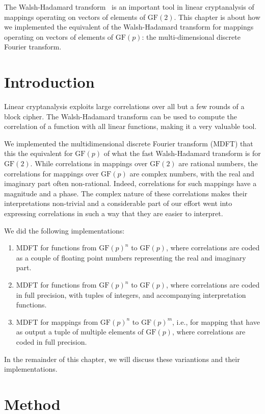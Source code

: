 \documentclass{report}
\newcommand{\GF}{\text{GF}}
\begin{document}
The Walsh-Hadamard transform~\cite{wiki2018transform} is an important tool in linear cryptanalysis of mappings operating on vectors of elements of $\GF(2)$.
This chapter is about how we implemented the equivalent of the Walsh-Hadamard transform for mappings operating on vectors of elements of ${\GF(p)}$: the multi-dimensional discrete Fourier transform.

\section{Introduction}

Linear cryptanalysis exploits large correlations over all but a few rounds of a block cipher. The Walsh-Hadamard transform can be used to compute the correlation of a function with all linear functions, making it a very valuable tool.

We implemented the multidimensional discrete Fourier transform (MDFT) that this the equivalent for $\GF(p)$ of what the fast Walsh-Hadamard transform is for $\GF(2)$. While correlations in mappings over $\GF(2)$ are rational numbers, the correlations for mappings over $\GF(p)$ are complex numbers, with the real and imaginary part often non-rational. Indeed, correlations for such mappings have a magnitude and a phase. The complex nature of these correlations makes their interpretations non-trivial and a considerable part of our effort went into expressing correlations in such a way that they are easier to interpret.

We did the following implementations:
\begin{enumerate}
\item MDFT for functions from ${\GF(p)}^n$ to ${\GF(p)}$, where correlations are coded as a couple of floating point numbers representing the real and imaginary part.
\item MDFT for functions from ${\GF(p)}^n$ to ${\GF(p)}$, where correlations are coded in full precision, with tuples of integers, and accompanying interpretation functions.
\item MDFT for mappings from ${\GF(p)}^n$ to ${\GF(p)}^m$, i.e., for mapping that have as output a tuple of multiple elements of $\GF(p)$, where correlations are coded in full precision.
\end{enumerate}

In the remainder of this chapter, we will discuss these variantions and their implementations.

\section{Method}
\end{document}
